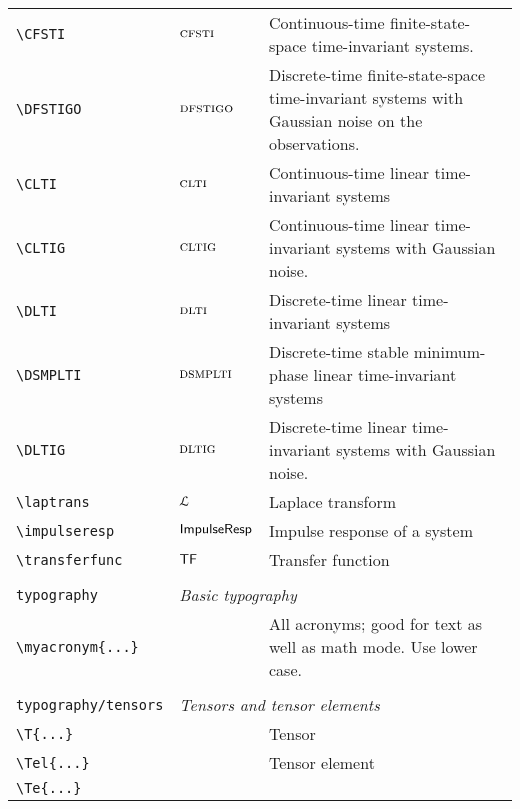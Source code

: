\begin{longtable}{lll}
 {\color[rgb]{0.5,0.5,0.5}\texttt{\textbackslash CFSTI}} & $\textsc{cfsti}$ &  Continuous-time finite-state-space time-invariant systems.\\ 
 {\color[rgb]{0.5,0.5,0.5}\texttt{\textbackslash DFSTIGO}} & $\textsc{dfstigo}$ &  Discrete-time finite-state-space time-invariant systems with Gaussian noise on the observations.\\ 
 {\color[rgb]{0.5,0.5,0.5}\texttt{\textbackslash CLTI}} & $\textsc{clti}$ &  Continuous-time linear time-invariant systems\\ 
 {\color[rgb]{0.5,0.5,0.5}\texttt{\textbackslash CLTIG}} & $\textsc{cltig}$ &  Continuous-time linear time-invariant systems with Gaussian noise.\\ 
 {\color[rgb]{0.5,0.5,0.5}\texttt{\textbackslash DLTI}} & $\textsc{dlti}$ &  Discrete-time linear time-invariant systems\\ 
 {\color[rgb]{0.5,0.5,0.5}\texttt{\textbackslash DSMPLTI}} & $\textsc{dsmplti}$ &  Discrete-time stable minimum-phase linear time-invariant systems\\ 
 {\color[rgb]{0.5,0.5,0.5}\texttt{\textbackslash DLTIG}} & $\textsc{dltig}$ &  Discrete-time linear time-invariant systems with Gaussian noise.\\ 
 {\color[rgb]{0.5,0.5,0.5}\texttt{\textbackslash laptrans}} & $\mathcal{L}$ &  Laplace transform\\ 
 {\color[rgb]{0.5,0.5,0.5}\texttt{\textbackslash impulseresp}} & $\mathsf{ImpulseResp}$ &  Impulse response of a system\\ 
 {\color[rgb]{0.5,0.5,0.5}\texttt{\textbackslash transferfunc}} & $\mathsf{TF}$ &  Transfer function\\ 
  &  & \\ 
 {\color[rgb]{0.5,0.5,0.5}\texttt{typography}} & \multicolumn{2}{l}{\emph{Basic typography}}\\ 
 \hline
\hline
{\color[rgb]{0.5,0.5,0.5}\texttt{\textbackslash myacronym\{...\}}} &  &  All acronyms; good for text as well as math mode. Use lower case.\\ 
  &  & \\ 
 {\color[rgb]{0.5,0.5,0.5}\texttt{typography/tensors}} & \multicolumn{2}{l}{\emph{Tensors and tensor elements}}\\ 
 \hline
{\color[rgb]{0.5,0.5,0.5}\texttt{\textbackslash T\{...\}}} &  &  Tensor\\ 
 {\color[rgb]{0.5,0.5,0.5}\texttt{\textbackslash Tel\{...\}}} &  &  Tensor element\\ 
 {\color[rgb]{0.5,0.5,0.5}\texttt{\textbackslash Te\{...\}}} &  & \\ 

\end{longtable}
